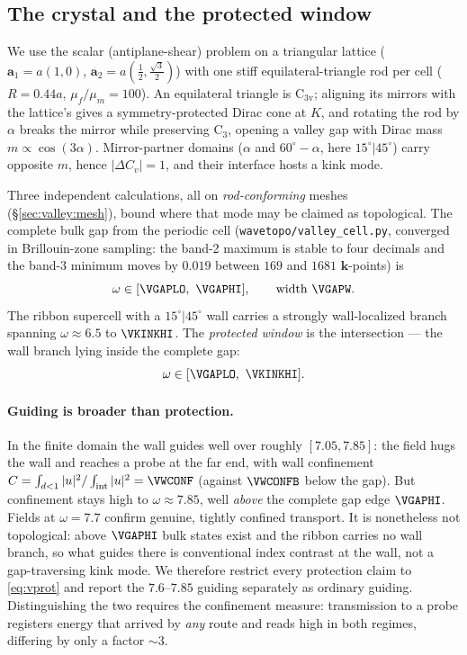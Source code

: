 \documentclass[11pt]{article}
\begin{document}
\subsection{The crystal and the protected window}
We use the scalar (antiplane-shear) problem on a triangular lattice
($\mathbf a_1=a(1,0)$, $\mathbf a_2=a(\tfrac12,\tfrac{\sqrt3}{2})$) with one
stiff equilateral-triangle rod per cell ($R=0.44a$, $\mu_f/\mu_m=100$). An
equilateral triangle is C$_{3\mathrm v}$; aligning its mirrors with the lattice's
gives a symmetry-protected Dirac cone at $K$, and rotating the rod by $\alpha$
breaks the mirror while preserving C$_3$, opening a valley gap with Dirac mass
$m\propto\cos(3\alpha)$. Mirror-partner domains ($\alpha$ and $60^\circ-\alpha$,
here $15^\circ|45^\circ$) carry opposite $m$, hence $|\Delta C_v|=1$, and their
interface hosts a kink mode.

Three independent calculations, all on \emph{rod-conforming} meshes
(\S\ref{sec:valley:mesh}), bound where that mode may be claimed as topological.
The complete bulk gap from the periodic cell
(\texttt{wavetopo/valley\_cell.py}, converged in Brillouin-zone sampling: the
band-2 maximum is stable to four decimals and the band-3 minimum moves by $0.019$
between $169$ and $1681$ $\mathbf k$-points) is
\begin{equation}
  \omega\in[\VGAPLO,\ \VGAPHI],\qquad \text{width }\VGAPW .
  \label{eq:vgap}
\end{equation}
The ribbon supercell with a $15^\circ|45^\circ$ wall carries a strongly
wall-localized branch spanning $\omega\approx6.5$ to $\VKINKHI$. The
\emph{protected window} is the intersection --- the wall branch lying inside the
complete gap:
\begin{equation}
  \omega\in[\VGAPLO,\ \VKINKHI].
  \label{eq:vprot}
\end{equation}

\paragraph{Guiding is broader than protection.} In the finite domain the wall
guides well over roughly $[7.05,7.85]$: the field hugs the wall and reaches a
probe at the far end, with wall confinement
$C=\int_{d<1}|u|^2/\int_{\rm int}|u|^2 = \VWCONF$ (against $\VWCONFB$ below the
gap). But confinement stays high to $\omega\approx7.85$, well \emph{above} the
complete gap edge $\VGAPHI$. Fields at $\omega=7.7$ confirm genuine, tightly
confined transport. It is nonetheless not topological: above $\VGAPHI$ bulk
states exist and the ribbon carries no wall branch, so what guides there is
conventional index contrast at the wall, not a gap-traversing kink mode. We
therefore restrict every protection claim to \eqref{eq:vprot} and report the
$7.6$--$7.85$ guiding separately as ordinary guiding. Distinguishing the two
requires the confinement measure: transmission to a probe registers energy that
arrived by \emph{any} route and reads high in both regimes, differing by only a
factor $\sim\!3$.
\end{document}
